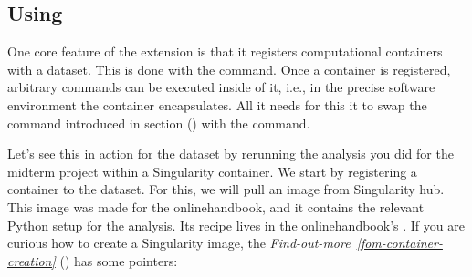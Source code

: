 \ignorespaces 

\subsection{Using }
\label{\detokenize{basics/101-133-containersrun:using-datalad-containers}}\label{\detokenize{basics/101-133-containersrun:index-2}}
\sphinxAtStartPar
One core feature of the  extension is that it registers
computational containers with a dataset. This is done with the
 command.
Once a container is registered, arbitrary commands can be executed inside of
it, i.e., in the precise software environment the container encapsulates. All it
needs for this it to swap the  command introduced in
section {\hyperref[\detokenize{basics/101-108-run:run}]{}} () with the  command.

\sphinxAtStartPar
Let’s see this in action for the  dataset by rerunning
the analysis you did for the midterm project within a Singularity container.
We start by registering a container to the dataset.
For this, we will pull an image from Singularity hub. This image was made
for the online\sphinxhyphen{}handbook, and it contains the relevant Python setup for
the analysis. Its recipe lives in the online\sphinxhyphen{}handbook’s
.
If you are curious how to create a Singularity image, the \textit{Find-out-more}~{\findoutmoreiconinline}\textit{\ref{fom-container-creation}} {\hyperref[\detokenize{basics/101-133-containersrun:fom-container-creation}]{}} () has some pointers:

